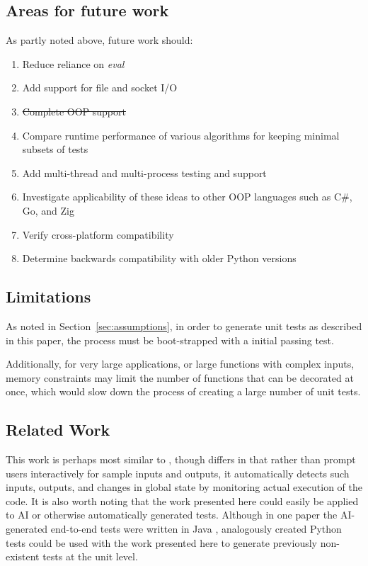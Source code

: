 \documentclass[10pt, conference]{IEEEtran}
\makeatletter
\providecommand{\DIFdel}[1]{{\protect\color{red}\sout{#1}}} %
\providecommand{\DIFdelbegin}{} %
\providecommand{\DIFdelend}{} %
\newcommand{\DIFscaledelfig}{0.5}
\newlength{\DIFdelgraphicswidth} %
\newlength{\DIFdelgraphicsheight} %
\newcommand{\DIFdelincludegraphics}[2][]{%
\sbox{\DIFdelgraphicsbox}{\DIFOincludegraphics[#1]{#2}}%
\settoboxwidth{\DIFdelgraphicswidth}{\DIFdelgraphicsbox} %
\settoboxtotalheight{\DIFdelgraphicsheight}{\DIFdelgraphicsbox} %
\scalebox{\DIFscaledelfig}{%
\parbox[b]{\DIFdelgraphicswidth}{\usebox{\DIFdelgraphicsbox}\\[-\baselineskip] \rule{\DIFdelgraphicswidth}{0em}}\llap{\resizebox{\DIFdelgraphicswidth}{\DIFdelgraphicsheight}{%
\setlength{\unitlength}{\DIFdelgraphicswidth}%
\begin{picture}(1,1)%
\thicklines\linethickness{2pt} %
{\color[rgb]{1,0,0}\put(0,0){\framebox(1,1){}}}%
{\color[rgb]{1,0,0}\put(0,0){\line( 1,1){1}}}%
{\color[rgb]{1,0,0}\put(0,1){\line(1,-1){1}}}%
\end{picture}%
}\hspace*{3pt}}} %
} %
\DeclareRobustCommand{\DIFdelbegin}{\DIFOdelbegin \let\includegraphics\DIFdelincludegraphics} %
\DeclareRobustCommand{\DIFdelend}{\DIFOaddend \let\includegraphics\DIFOincludegraphics} %
\let\sout@orig\sout %
\renewcommand{\sout}[1]{\ifmmode\text{\sout@orig{\ensuremath{#1}}}\else\sout@orig{#1}\fi} %
\makeatother
\begin{document}
\subsection{Areas for future work}\label{sec:tuning-2}
As partly noted above, future work should: 
\begin{enumerate}
  \item Reduce reliance on \textit{eval}
  \item Add support for file and socket I/O
  \item \DIFdelbegin \DIFdel{Complete OOP support
  }%
\item%
\DIFdelend Compare runtime performance of various algorithms for keeping minimal subsets of tests
  \item Add multi-thread and multi-process testing and support
  \item Investigate applicability of these ideas to other OOP languages such as C\#, Go, and Zig
  \item Verify cross-platform compatibility
  \item Determine backwards compatibility with older Python versions
\end{enumerate}

\subsection{Limitations}\label{sec:limitations}
As noted in Section~\ref{sec:assumptions}, in order to 
generate unit tests as described in this paper, the 
process must be boot-strapped with a initial passing test.

Additionally, for very large applications, or large
functions with complex inputs, memory constraints may 
limit the number of functions that can be decorated at once,
which would slow down the process of creating 
a large number of unit tests.

\subsection{Related Work}\label{sec:related-work}
This work is perhaps most similar to 
\cite{lahiri2023interactivecodegenerationtestdriven}, though
differs in that rather than prompt users interactively for sample inputs and
outputs, it automatically detects such inputs, outputs, and changes in global
state by monitoring actual execution of the code.  It is also worth noting 
that the work presented here could easily be applied to AI or otherwise 
automatically generated tests.  Although in one paper the AI-generated end-to-end tests 
were written in Java \cite{leotta2024ai}, analogously created Python tests could
be used with the work presented here to generate previously non-existent 
tests at the unit level.
\end{document}

